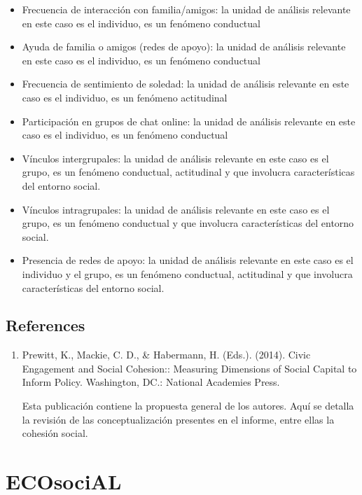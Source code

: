 \documentclass[
  12pt,
]{book}
\begin{document}
\begin{itemize}
\item
  Frecuencia de interacción con familia/amigos: la unidad de análisis
  relevante en este caso es el individuo, es un fenómeno conductual
\item
  Ayuda de familia o amigos (redes de apoyo): la unidad de análisis
  relevante en este caso es el individuo, es un fenómeno conductual
\item
  Frecuencia de sentimiento de soledad: la unidad de análisis
  relevante en este caso es el individuo, es un fenómeno actitudinal
\item
  Participación en grupos de chat online: la unidad de análisis
  relevante en este caso es el individuo, es un fenómeno conductual
\item
  Vínculos intergrupales: la unidad de análisis relevante en este caso
  es el grupo, es un fenómeno conductual, actitudinal y que involucra
  características del entorno social.
\item
  Vínculos intragrupales: la unidad de análisis relevante en este caso
  es el grupo, es un fenómeno conductual y que involucra
  características del entorno social.
\item
  Presencia de redes de apoyo: la unidad de análisis relevante en este
  caso es el individuo y el grupo, es un fenómeno conductual,
  actitudinal y que involucra características del entorno social.
\end{itemize}

\hypertarget{references}{%
\section{References}\label{references}}

\begin{enumerate}
\def\labelenumi{\arabic{enumi}.}
\item
  Prewitt, K., Mackie, C. D., \& Habermann, H. (Eds.). (2014). Civic
  Engagement and Social Cohesion:: Measuring Dimensions of Social
  Capital to Inform Policy. Washington, DC.: National Academies
  Press.

  Esta publicación contiene la propuesta general de los autores. Aquí
  se detalla la revisión de las conceptualización presentes en el
  informe, entre ellas la cohesión social.
\end{enumerate}

\hypertarget{ecosocial}{%
\chapter{ECOsociAL}\label{ecosocial}}
\end{document}
